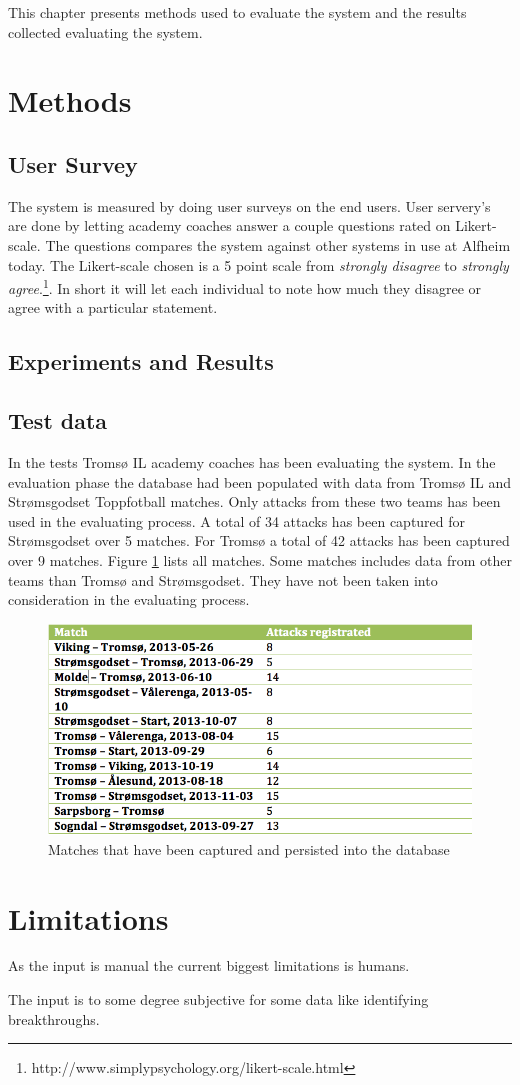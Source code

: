 This chapter presents methods used to evaluate the system and the results collected evaluating the system. 

\section{Methods}

\subsection{User Survey}

The system is measured by doing user surveys on the end users. User servery's are done by letting academy coaches answer a couple questions rated on Likert-scale. The questions compares the system against other systems in use at Alfheim today. The Likert-scale chosen is a 5 point scale from \textit{strongly disagree} to \textit{strongly agree}.\footnote{http://www.simplypsychology.org/likert-scale.html}. In short it will let each individual to note how much they disagree or agree with a particular statement.

\subsection{Experiments and Results}

\subsection{Test data}

In the tests Tromsø IL academy coaches has been evaluating the system. In the evaluation phase the database had been populated with data from Tromsø IL and Strømsgodset Toppfotball matches. Only attacks from these two teams has been used in the evaluating process. A total of 34 attacks has been captured for Strømsgodset over 5 matches. For Tromsø a total of 42 attacks has been captured over 9 matches. Figure \ref{fig:matches_regged} lists all matches. Some matches includes data from other teams than Tromsø and Strømsgodset. They have not been taken into consideration in the evaluating process.

\begin{figure}[ht!]
\centering
\includegraphics[width=1\textwidth]{images/general/matched_regged.png}
\caption{Matches that have been captured and persisted into the database}
\label{fig:matches_regged}
\end{figure}


\section{Limitations}

As the input is manual the current biggest limitations is humans. 

The input is to some degree subjective for some data like identifying breakthroughs.